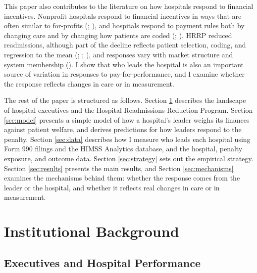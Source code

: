 \documentclass[12pt]{article}
\theoremstyle{definition}   %
\begin{document}
    This paper also contributes to the literature on how hospitals respond to financial incentives. Nonprofit hospitals respond to financial incentives in ways that are often similar to for-profits (\cite{duggan2000hospital}; \cite{horwitz2009hospital}), and hospitals respond to payment rules both by changing care and by changing how patients are coded (\cite{silverman2004medicare}; \cite{dafny2005hospitals}). HRRP reduced readmissions, although part of the decline reflects patient selection, coding, and regression to the mean (\cite{gupta2021impacts}; \cite{ody2019decreases}; \cite{ibrahim2018association}), and responses vary with market structure and system membership (\cite{kunz2024assessing}). I show that who leads the hospital is also an important source of variation in responses to pay-for-performance, and I examine whether the response reflects changes in care or in measurement.

    The rest of the paper is structured as follows. Section \ref{sec:background} describes the landscape of hospital executives and the Hospital Readmissions Reduction Program. Section \ref{sec:model} presents a simple model of how a hospital's leader weighs its finances against patient welfare, and derives predictions for how leaders respond to the penalty. Section \ref{sec:data} describes how I measure who leads each hospital using Form 990 filings and the HIMSS Analytics database, and the hospital, penalty exposure, and outcome data. Section \ref{sec:strategy} sets out the empirical strategy. Section \ref{sec:results} presents the main results, and Section \ref{sec:mechanisms} examines the mechanisms behind them: whether the response comes from the leader or the hospital, and whether it reflects real changes in care or in measurement. 
    

\section{Institutional Background}\label{sec:background}

\subsection{Executives and Hospital Performance}
\end{document}
